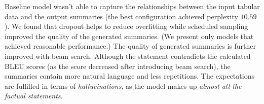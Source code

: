 Baseline model wasn't able to capture the relationships between the input tabular data and the output summaries (the best configuration achieved perplexity $10.59$). We found that dropout helps to reduce overfitting while scheduled sampling improved the quality of the generated summaries. (We present only models that achieved reasonable performance.) The quality of generated summaries is further improved with beam search. Although the statement contradicts the calculated BLEU scores (as the score decreased after introducing beam search), the summaries contain more natural language and less repetitions. The expectations are fulfilled in terms of \emph{hallucinations}, as the model makes up \emph{almost all the factual statements}.

\begin{table}[h]
    \centering
    \caption{Performance metrics on the baseline models.} \label{table:metrics_baseline}
\end{table}

